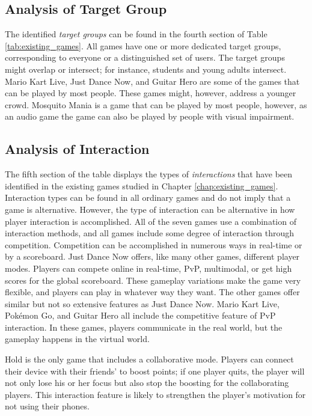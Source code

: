 \documentclass[../Main.tex]{subfiles}
\begin{document}
\subsection{Analysis of Target Group}
The identified \textit{target groups} can be found in the fourth section of Table \ref{tab:existing_games}. All games have one or more dedicated target groups, corresponding to everyone or a distinguished set of users. The target groups might overlap or intersect; for instance, students and young adults intersect. Mario Kart Live, Just Dance Now, and Guitar Hero are some of the games that can be played by most people. These games might, however, address a younger crowd. Mosquito Mania is a game that can be played by most people, however, as an audio game the game can also be played by people with visual impairment.

\subsection{Analysis of Interaction}
The fifth section of the table displays the types of \textit{interactions} that have been identified in the existing games studied in Chapter \ref{chap:existing_games}. Interaction types can be found in all ordinary games and do not imply that a game is alternative. However, the type of interaction can be alternative in how player interaction is accomplished. All of the seven games use a combination of interaction methods, and all games include some degree of interaction through competition. Competition can be accomplished in numerous ways in real-time or by a scoreboard. Just Dance Now offers, like many other games, different player modes. Players can compete online in real-time, PvP, multimodal, or get high scores for the global scoreboard. These gameplay variations make the game very flexible, and players can play in whatever way they want. The other games offer similar but not so extensive features as Just Dance Now. Mario Kart Live, Pokémon Go, and Guitar Hero all include the competitive feature of PvP interaction. In these games, players communicate in the real world, but the gameplay happens in the virtual world.

Hold is the only game that includes a collaborative mode. Players can connect their device with their friends’ to boost points; if one player quits, the player will not only lose his or her focus but also stop the boosting for the collaborating players. This interaction feature is likely to strengthen the player’s motivation for not using their phones.
 
\end{document}
